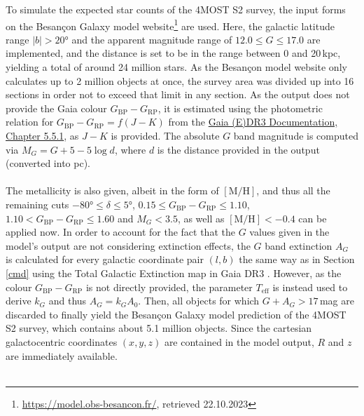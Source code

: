 \documentclass[a4paper,11pt]{article}
\begin{document}
%
To simulate the expected star counts of the 4MOST S2 survey, the input forms on the Besan\c{c}on Galaxy model website\footnote{\url{https://model.obs-besancon.fr/}, retrieved 22.10.2023} are used. Here, the galactic latitude range $|b|>20$° and the apparent magnitude range of $12.0\leq G\leq17.0$ are implemented, and the distance is set to be in the range between 0 and 20\,kpc, yielding a total of around 24 million stars. As the Besan\c{c}on model website only calculates up to 2 million objects at once, the survey area was divided up into 16 sections in order not to exceed that limit in any section. As the output does not provide the Gaia colour $G_\mathrm{BP}-G_\mathrm{RP}$, it is estimated using the photometric relation for $G_\mathrm{BP}-G_\mathrm{RP}=f(J-K)$ from the \href{https://gea.esac.esa.int/archive/documentation/GEDR3/Data_processing/chap_cu5pho/cu5pho_sec_photSystem/cu5pho_ssec_photRelations.html}{Gaia (E)DR3 Documentation, Chapter 5.5.1}, as $J-K$ is provided. The absolute $G$ band magnitude is computed via $M_G=G+5-5\log{d}$, where $d$ is the distance provided in the output (converted into pc).\\ \\
%
The metallicity is also given, albeit in the form of $\mathrm{[M/H]}$, and thus all the remaining cuts $-80$°$\leq\delta\leq5$°, $0.15\leq G_\mathrm{BP}-G_\mathrm{RP}\leq1.10$, $1.10<G_\mathrm{BP}-G_\mathrm{RP}\leq1.60$ and $M_G<3.5$, as well as $\mathrm{[M/H]}<-0.4$ can be applied now. In order to account for the fact that the $G$ values given in the model's output are not considering extinction effects, the $G$ band extinction $A_G$ is calculated for every galactic coordinate pair $(l,b)$ the same way as in Section \ref{cmd} using the Total Galactic Extinction map in Gaia DR3 \citep{delchambre23}. However, as the colour $G_\mathrm{BP}-G_\mathrm{RP}$ is not directly provided, the parameter $T_\mathrm {eff}$ is instead used to derive $k_G$ and thus $A_G=k_GA_0$. Then, all objects for which $G+A_G>17$\,mag are discarded to finally yield the Besan\c{c}on Galaxy model prediction of the 4MOST S2 survey, which contains about 5.1 million objects. Since the cartesian galactocentric coordinates $(x,y,z)$ are contained in the model output, $R$ and $z$ are immediately available.\\ \\
%
\end{document}
